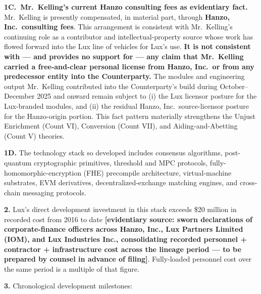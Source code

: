 \documentclass[11pt,letterpaper]{article}
\begin{document}
\textbf{1C.\ Mr.\ Kelling's current Hanzo consulting fees as
evidentiary fact.} Mr.\ Kelling is presently compensated, in
material part, through \textbf{Hanzo, Inc.\ consulting fees}. This
arrangement is consistent with Mr.\ Kelling's continuing role as a
contributor and intellectual-property source whose work has flowed
forward into the Lux line of vehicles for Lux's use. \textbf{It is
not consistent with --- and provides no support for --- any claim that
Mr.\ Kelling carried a free-and-clear personal license from Hanzo,
Inc.\ or from any predecessor entity into the Counterparty.} The
modules and engineering output Mr.\ Kelling contributed into the
Counterparty's build during October--December 2025 and onward
remain subject to (i) the Lux licensor posture for the Lux-branded
modules, and (ii) the residual Hanzo, Inc.\ source-licensor posture
for the Hanzo-origin portion. This fact pattern materially
strengthens the Unjust Enrichment (Count VI), Conversion (Count
VII), and Aiding-and-Abetting (Count V) theories.

\textbf{1D.} The technology stack so developed includes consensus
algorithms, post-quantum cryptographic primitives, threshold and
MPC protocols, fully-homomorphic-encryption (FHE) precompile
architecture, virtual-machine substrates, EVM derivatives,
decentralized-exchange matching engines, and cross-chain messaging
protocols.

\textbf{2.} Lux's direct development investment in this stack exceeds
\$20 million in recorded cost from 2016 to date \textbf{[evidentiary
source: sworn declarations of corporate-finance officers
across Hanzo, Inc., Lux Partners Limited (IOM), and Lux
Industries Inc., consolidating recorded personnel + contractor
+ infrastructure cost across the lineage period --- to be
prepared by counsel in advance of filing]}. Fully-loaded personnel
cost over the same period is a multiple of that figure.

\textbf{3.} Chronological development milestones:
\end{document}
